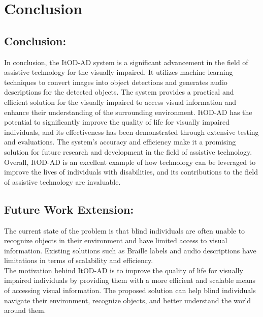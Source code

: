 \section{Conclusion}
\subsection{Conclusion:}
In conclusion, the ItOD-AD system is a significant advancement in the field of assistive technology for the visually impaired. It utilizes machine learning techniques to convert images into object detections and generates audio descriptions for the detected objects. The system provides a practical and efficient solution for the visually impaired to access visual information and enhance their understanding of the surrounding environment. ItOD-AD has the potential to significantly improve the quality of life for visually impaired individuals, and its effectiveness has been demonstrated through extensive testing and evaluations. The system's accuracy and efficiency make it a promising solution for future research and development in the field of assistive technology. Overall, ItOD-AD is an excellent example of how technology can be leveraged to improve the lives of individuals with disabilities, and its contributions to the field of assistive technology are invaluable.
\subsection{Future Work Extension:}
The current state of the problem is that blind individuals are often unable to recognize objects in their environment and have limited access to visual information. Existing solutions such as Braille labels and audio descriptions have limitations in terms of scalability and efficiency.\\
The motivation behind ItOD-AD is to improve the quality of life for visually impaired individuals by providing them with a more efficient and scalable means of accessing visual information. The proposed solution can help blind individuals navigate their environment, recognize objects, and better understand the world around them.

